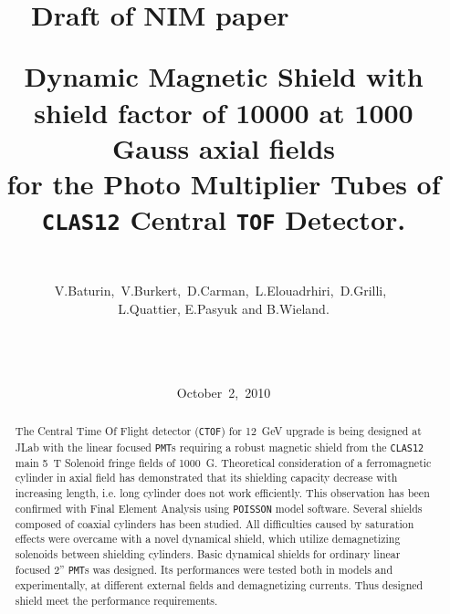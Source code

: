 \documentclass[12pt]{article}
\date{October~2,~2010}
\begin{document}
\pagestyle{plain}
%
%
%
%
\title
{\vspace{-.2cm}
\begin{flushright}
\normalsize{Draft of NIM paper ~~~~~~~~}
\end{flushright}
\bigskip 
\bigskip
\bigskip
Dynamic Magnetic Shield with shield factor of 
 10000 at 1000 Gauss axial fields  \\
for the  Photo Multiplier Tubes of {\tt CLAS12} Central {\tt TOF} Detector.}
\author
{
{}\\
\mbox
{V.Baturin, V.Burkert, D.Carman, L.Elouadrhiri, D.Grilli, }\\
{ L.Quattier, E.Pasyuk and B.Wieland.}\\
{}  \\
\mbox
{}\\
{}\\
}
\maketitle
\begin{abstract}
The Central Time Of Flight detector ({\tt CTOF}) for 12~GeV upgrade 
is being designed at JLab with the  
linear focused   {\tt PMT}s  requiring a robust magnetic shield from the 
 {\tt CLAS12}   main
5~T Solenoid fringe fields of 1000~G. 
Theoretical consideration of a  ferromagnetic 
cylinder in axial field  
has demonstrated  that its  shielding capacity  
decrease  with  increasing length,
i.e. long cylinder does not work efficiently. 
This observation
has been confirmed with Final Element Analysis using  {\tt POISSON} model software.
 Several shields  composed of  coaxial cylinders has been studied.
All  difficulties caused by  saturation effects  
were overcame with a novel dynamical shield, which utilize demagnetizing  solenoids 
between shielding cylinders.
Basic dynamical shields for ordinary linear focused 2'' {\tt PMT}s was  
designed. Its performances were tested both in models and  experimentally, 
at different external fields and demagnetizing currents. Thus designed  
shield meet the performance requirements.  
\end{abstract}
\end{document}
